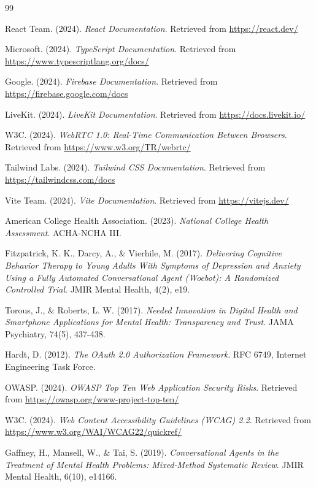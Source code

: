 \documentclass[11pt,a4paper]{article}
\begin{document}
\begin{thebibliography}{99}

React Team. (2024). \textit{React Documentation}. 
Retrieved from \url{https://react.dev/}

Microsoft. (2024). \textit{TypeScript Documentation}. 
Retrieved from \url{https://www.typescriptlang.org/docs/}

Google. (2024). \textit{Firebase Documentation}. 
Retrieved from \url{https://firebase.google.com/docs}

LiveKit. (2024). \textit{LiveKit Documentation}. 
Retrieved from \url{https://docs.livekit.io/}

W3C. (2024). \textit{WebRTC 1.0: Real-Time Communication Between Browsers}. 
Retrieved from \url{https://www.w3.org/TR/webrtc/}

Tailwind Labs. (2024). \textit{Tailwind CSS Documentation}. 
Retrieved from \url{https://tailwindcss.com/docs}

Vite Team. (2024). \textit{Vite Documentation}. 
Retrieved from \url{https://vitejs.dev/}

American College Health Association. (2023). \textit{National College Health Assessment}. 
ACHA-NCHA III.

Fitzpatrick, K. K., Darcy, A., \& Vierhile, M. (2017). 
\textit{Delivering Cognitive Behavior Therapy to Young Adults With Symptoms of Depression and Anxiety Using a Fully Automated Conversational Agent (Woebot): A Randomized Controlled Trial}. 
JMIR Mental Health, 4(2), e19.

Torous, J., \& Roberts, L. W. (2017). 
\textit{Needed Innovation in Digital Health and Smartphone Applications for Mental Health: Transparency and Trust}. 
JAMA Psychiatry, 74(5), 437-438.

Hardt, D. (2012). \textit{The OAuth 2.0 Authorization Framework}. 
RFC 6749, Internet Engineering Task Force.

OWASP. (2024). \textit{OWASP Top Ten Web Application Security Risks}. 
Retrieved from \url{https://owasp.org/www-project-top-ten/}

W3C. (2024). \textit{Web Content Accessibility Guidelines (WCAG) 2.2}. 
Retrieved from \url{https://www.w3.org/WAI/WCAG22/quickref/}

Gaffney, H., Mansell, W., \& Tai, S. (2019). 
\textit{Conversational Agents in the Treatment of Mental Health Problems: Mixed-Method Systematic Review}. 
JMIR Mental Health, 6(10), e14166.


\end{thebibliography}
\end{document}
